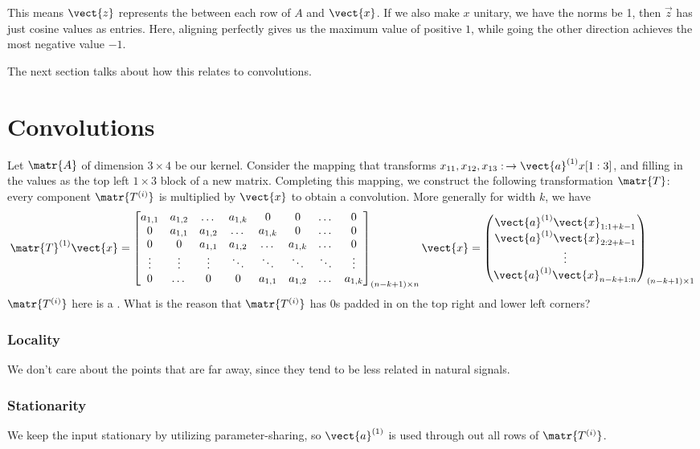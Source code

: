 This means $\vect{z}$ represents the  between each row of $A$ and $\vect{x}$. If we also make $x$ unitary, we have the norms be 1, then $\vec{z}$ has just cosine values as entries. Here, aligning perfectly gives us the maximum value of positive $1$, while going the other direction achieves the most negative value $-1$.

The next section talks about how this relates to convolutions.
\section{Convolutions}
Let $\matr{A}$ of dimension $3\times 4$ be our kernel. Consider the mapping that transforms $x_{11}, x_{12}, x_{13}:\, \to \vect{a}^{(1)} x[1:3]$, and filling in the values as the top left $1\times 3$ block of a new matrix. Completing this mapping, we construct the following transformation $\matr{T}$: every component $\matr{T^{(i)}}$ is multiplied by $\vect{x}$ to obtain a convolution. More generally for width $k$, we have
\[
\matr{T}^{(1)}\vect{x} =
\begin{bmatrix}
    a_{1,1} & a_{1,2} & \dotsc & a_{1,k} & 0 & 0 & \dotsc & 0 \\
    0 & a_{1,1} & a_{1,2} & \dotsc & a_{1,k} & 0 & \dotsc & 0 \\
    0 & 0 & a_{1,1} & a_{1,2} & \dotsc & a_{1,k} & \dotsc & 0 \\
    \vdots & \vdots & \vdots & \ddots & \ddots & \ddots & \ddots & \vdots \\
    0 & \dotsc & 0 & 0 & a_{1,1} & a_{1,2} & \dotsc & a_{1,k}
\end{bmatrix}_{(n-k+1) \times n} \vect{x}=
\begin{pmatrix}
    \vect{a}^{(1)} \vect{x}_{1:1+k-1} \\ \vect{a}^{(1)} \vect{x}_{2:2+k-1} \\ \vdots \\ \vect{a}^{(1)}  \vect{x}_{n-k+1:n}
\end{pmatrix}_{(n-k+1) \times 1}
\]
$\matr{T^{(i)}}$ here is a . What is the reason that $\matr{T^{(i)}}$ has $0$s padded in on the top right and lower left corners?
\subsubsection{Locality}
We don't care about the points that are far away, since they tend to be less related in natural signals.

\subsubsection{Stationarity}
We keep the input stationary by utilizing parameter-sharing, so $\vect{a}^{(1)}$ is used through out all rows of $\matr{T^{(i)}}$.
